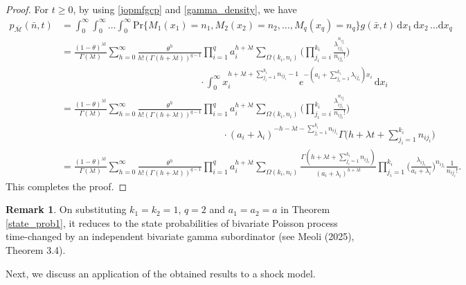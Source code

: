 \documentclass[12pt,oneside,reqno]{amsart}
\numberwithin{equation}{section}
\theoremstyle{definition}
\numberwithin{equation}{section}
\newtheorem{remark}{\bf Remark}[section]
\theoremstyle{remarkstyle}
\begin{document}
\begin{proof}
	For $t\geq0$, by using \eqref{jopmfgcp} and \eqref{gamma_density}, we have
	{\footnotesize
		\begin{align*}
			p_{\bar{\mathscr{M}}}(\bar{n},t)&=\int_{0}^{\infty}\int_{0}^{\infty}\dots\int_{0}^{\infty} \mathrm{Pr}\{M_1(x_1)=n_1,M_2(x_2)=n_2,\dots,M_q(x_q)=n_q\}g(\bar{x},t)\,\mathrm{d}x_1\,\mathrm{d}x_2\,\dots\mathrm{d}x_q\\
			&=\frac{(1-\theta)^{\lambda t}}{\Gamma(\lambda t)}\sum_{h=0}^{\infty}\frac{\theta^h}{h!(\Gamma(h+\lambda t))^{q-1}}\prod_{i=1}^{q}a_i^{h+\lambda t}\sum_{\Omega(k_i,n_i)}\Big(\prod_{j_i=i}^{k_i}\frac{\lambda_{ij_i}^{n_{ij_i}}}{n_{ij_i}!}\Big)\\
			&\hspace{6cm}\cdot\int_{0}^{\infty}x_i^{h+\lambda t+\sum_{j_i=1}^{k_i}n_{ij_i}-1}e^{-(a_i+\sum_{j_i=1}^{k_i}\lambda_{ij_i})x_i}\,\mathrm{d}x_i\\
			&=\frac{(1-\theta)^{\lambda t}}{\Gamma(\lambda t)}\sum_{h=0}^{\infty}\frac{\theta^h}{h!(\Gamma(h+\lambda t))^{q-1}}\prod_{i=1}^{q}a_i^{h+\lambda t}\sum_{\Omega(k_i,n_i)}\Big(\prod_{j_i=i}^{k_i}\frac{\lambda_{ij_i}^{n_{ij_i}}}{n_{ij_i}!}\Big)\\
			&\hspace{7cm}\cdot (a_i+\lambda_i)^{-h-\lambda t-\sum_{j_i=1}^{k_i}n_{ij_i}}\Gamma\Big(h+\lambda t+\sum_{j_i=1}^{k_i}n_{ij_i}\Big)\\
			&=\frac{(1-\theta)^{\lambda t}}{\Gamma(\lambda t)}\sum_{h=0}^{\infty}\frac{\theta^h}{h!(\Gamma(h+\lambda t))^{q-1}}\prod_{i=1}^{q}a_i^{h+\lambda t}\sum_{\Omega(k_i,n_i)}
			\frac{\Gamma(h+\lambda t+\sum_{j_i=1}^{k_i}n_{ij_i})}{(a_i+\lambda_i)^{h+\lambda t}}\prod_{j_i=1}^{k_i}\Big(\frac{\lambda_{ij_i}}{a_i+\lambda_i}\Big)^{n_{ij_i}}\frac{1}{n_{ij_i}!}.		
	\end{align*}}
	This completes the proof.
\end{proof}
\begin{remark}
On substituting $k_1=k_2=1$, $q=2$ and $a_1=a_2=a$ in Theorem \ref{state_prob1}, it reduces to the state probabilities of bivariate Poisson process time-changed by an independent bivariate gamma subordinator (see Meoli (2025), Theorem 3.4).
\end{remark}

Next, we discuss an application of the obtained results to a shock model.
\end{document}

